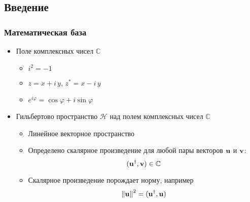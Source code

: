 \subsection{Введение}
\begin{frame}
    \frametitle{Математическая база}
    \begin{itemize}[<+->]
    \item
        Поле комплексных чисел $\mathbb{C}$
        \begin{itemize}[<+->]
        \item $i^2 = -1$
        \item $z = x + i\,y$, $z^\ast = x - i\, y$
        \item $e^{i \varphi} = \cos \varphi + i \sin \varphi$
        \end{itemize}
    \item
        Гильбертово пространство $\mathcal{H}$
        над полем комплексных чисел $\mathbb{C}$
        \begin{itemize}[<+->]
        \item Линейное векторное пространство
        \item
            Определено скалярное произведение для любой пары
            векторов $\bf{u}$ и $\bf{v}$:
            $$(\bf{u}^\dagger, \bf{v}) \in \mathbb{C}$$
        \item
            Скалярное произведение порождает норму, например
            $$\left\lVert\bf{u}\right\rVert^2 = (\bf {u}^\dagger, \bf{u})$$
        \end{itemize}
    \end{itemize}
\end{frame}
